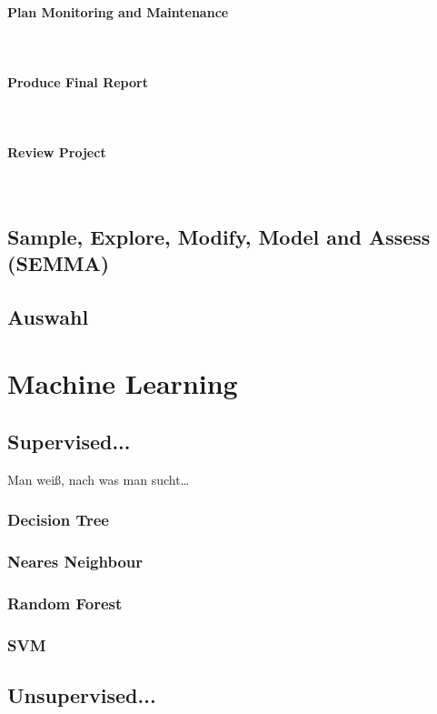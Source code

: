 \paragraph{Plan Monitoring and Maintenance}\mbox{} \\
\paragraph{Produce Final Report}\mbox{} \\
\paragraph{Review Project}\mbox{} \\

\subsection{Sample, Explore, Modify, Model and Assess (SEMMA)}
\subsection{Auswahl}


\section{Machine Learning}\label{sec:MachineLearning} 

\subsection{Supervised...}
Man weiß, nach was man sucht…
\subsubsection{Decision Tree}
\subsubsection{Neares Neighbour}
\subsubsection{Random Forest}
\subsubsection{SVM}
\subsection{Unsupervised...}

